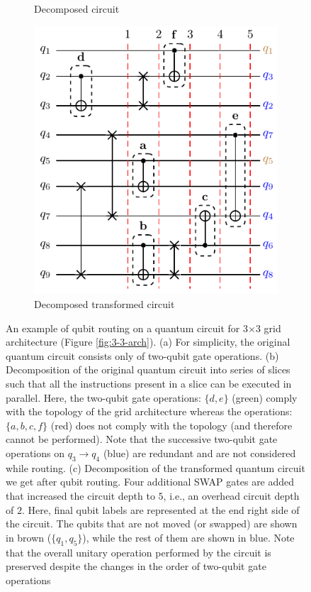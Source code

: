 \documentclass[%
 reprint,
amsmath,amssymb,
pra,
]{revtex4-2}
\begin{document}
\begin{figure}[t]
\begin{subfigure}[b]{0.30\linewidth}
        \caption{Decomposed circuit\label{fig:sliced_circ}}
    \end{subfigure}
    \begin{subfigure}[b]{0.33\linewidth}
        \includegraphics[width=\textwidth]{images/transformed_circ.pdf}
        \caption{Decomposed transformed circuit\label{fig:transformed_circ}}
    \end{subfigure}
    \caption{An example of qubit routing on a quantum circuit for 3$\times$3 grid architecture (Figure \ref{fig:3-3-arch}). (a) For simplicity, the original quantum circuit consists only of two-qubit gate operations. (b) Decomposition of the original quantum circuit into series of slices such that all the instructions present in a slice can be executed in parallel. Here, the two-qubit gate operations: $\{d,e\}$ (green) comply with the topology of the grid architecture whereas the operations: $\{a, b, c, f\}$ (red) does not comply with the topology (and therefore cannot be performed). Note that the successive two-qubit gate operations on $q_3\rightarrow q_4$ (blue) are redundant and are not considered while routing. (c) Decomposition of the transformed quantum circuit we get after qubit routing. Four additional SWAP gates are added that increased the circuit depth to $5$, i.e., an overhead circuit depth of $2$. Here, final qubit labels are represented at the end right side of the circuit. The qubits that are not moved (or swapped) are shown in brown ($\{q_1, q_5\}$), while the rest of them are shown in blue. Note that the overall unitary operation performed by the circuit is preserved despite the changes in the order of two-qubit gate operations}
    \label{fig:routing-example}
\end{figure}
\end{document}
